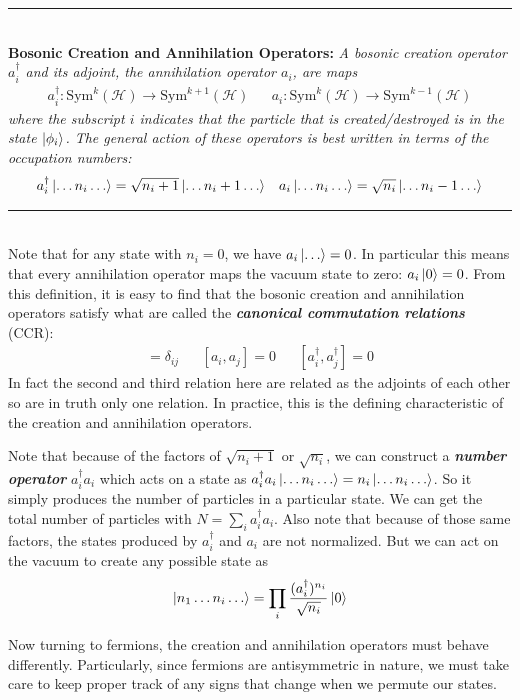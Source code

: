 \documentclass[onecolumn]{gwclass}
\renewcommand{\t}[1]{\text{#1}}
\begin{document}
\noindent\rule{\textwidth}{1pt}\\
\textbf{Bosonic Creation and Annihilation Operators:} \emph{A bosonic creation operator $a_i^\dagger$ and its adjoint, the annihilation operator $a_i$, are maps}
\begin{align*}
	a_i^\dagger : \t{Sym}^k(\mathscr{H}) \to \t{Sym}^{k+1}(\mathscr{H}) && a_i : \t{Sym}^k( \mathscr{H}) \to \t{Sym}^{k-1}(\mathscr{H})
\end{align*}
\emph{where the subscript $i$ indicates that the particle that is created/destroyed is in the state $\ket{\phi_i}$. The general action of these operators is best written in terms of the occupation numbers:}
\begin{align*}
	a_i^\dagger \ket{\dots n_i \dots} = \sqrt{n_i+1}\ket{\dots n_i + 1\dots} && a_i\ket{\dots n_i\dots} = \sqrt{n_i} \ket{\dots n_i-1\dots}
\end{align*}
\noindent\rule{\textwidth}{1pt}\\
Note that for any state with $n_i=0$, we have $a_i\ket{\dots}=0$. In particular this means that every annihilation operator maps the vacuum state to zero: $a_i\ket{0}=0$. From this definition, it is easy to find that the bosonic creation and annihilation operators satisfy what are called the \textbf{\emph{canonical commutation relations}} (CCR):
\begin{align*}
	[a_i, a_j^\dagger]=\delta_{ij} && [a_i, a_j]= 0 && [a_i^\dagger, a_j^\dagger]=0
\end{align*}
In fact the second and third relation here are related as the adjoints of each other so are in truth only one relation. In practice, this is the defining characteristic of the creation and annihilation operators. 

Note that because of the factors of $\sqrt{n_i+1}$ or $\sqrt{n_i}$, we can construct a \textbf{\emph{number operator}} $a_i^\dagger a_i$ which acts on a state as $a_i^\dagger a_i \ket{\dots n_i \dots} = n_i \ket{\dots n_i\dots}$. So it simply produces the number of particles in a particular state. We can get the total number of particles with $N=\sum_i a_i^\dagger a_i$. Also note that because of those same factors, the states produced by $a_i^\dagger$ and $a_i$ are not normalized. But we can act on the vacuum to create any possible state as 
$$ \ket{n_1\dots n_i \dots} = \prod_i\frac{(a_i^\dagger)^{n_i}}{\sqrt{n_i}}\ket{0} $$

Now turning to fermions, the creation and annihilation operators must behave differently. Particularly, since fermions are antisymmetric in nature, we must take care to keep proper track of any signs that change when we permute our states.
\end{document}
